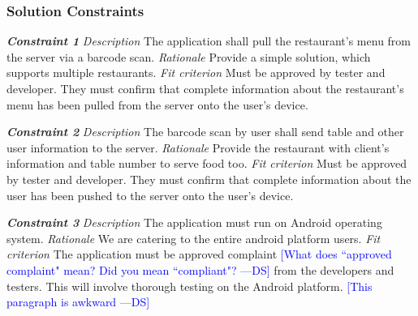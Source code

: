 \documentclass[12pt, titlepage]{article}
\newcommand{\authornote}[3]{\textcolor{#1}{[#3 ---#2]}}
\newcommand{\authornote}[3]{}
\newcommand{\ds}[1]{\authornote{blue}{DS}{#1}}
\begin{document}
\subsubsection{Solution Constraints}
\textbf{\textit{Constraint 1}}
\newline
\textit{Description}\newline
The application shall pull the restaurant’s menu from the server via a barcode scan.\newline\newline
\textit{Rationale}\newline
Provide a simple solution, which supports multiple restaurants. \newline\newline
\textit{Fit criterion}\newline
Must be approved by tester and developer. They must confirm that complete information about the restaurant’s menu has been pulled from the server onto the user’s device.\newline\newline

\noindent\textbf{\textit{Constraint 2}}
\newline
\textit{Description}\newline
The barcode scan by user shall send table and other user information to the server.\newline\newline
\textit{Rationale}\newline
Provide the restaurant with client’s information and table number to serve food too. \newline\newline
\textit{Fit criterion}\newline
Must be approved by tester and developer. They must confirm that complete information about the user has been pushed to the server onto the user’s device.\newline\newline

\noindent\textbf{\textit{Constraint 3}}
\newline
\textit{Description}\newline
The application must run on Android operating system. \newline\newline
\textit{Rationale}\newline
We are catering to the entire android platform users. \newline\newline
\textit{Fit criterion}\newline
The application must be approved complaint \ds{What does ``approved complaint" mean? Did you mean ``compliant"?} from the developers and testers. This will involve thorough testing on the Android platform. \ds{This paragraph is awkward}\newline\newline
\end{document}
